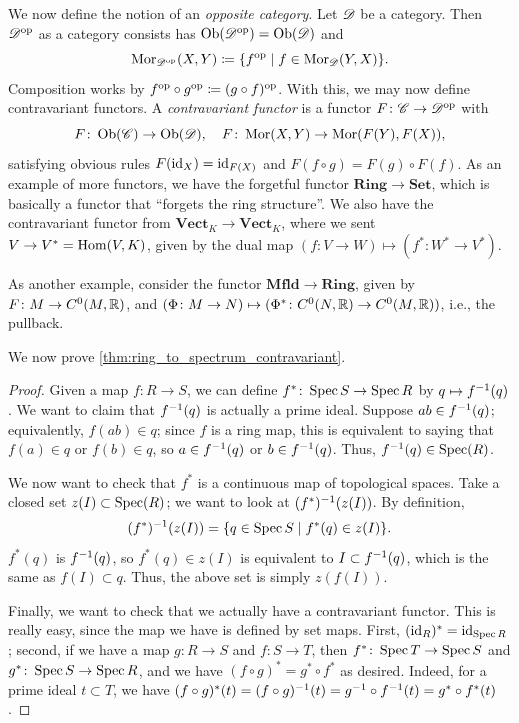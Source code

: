 We now define the notion of an \textit{opposite category}. Let $\mathscr D$ be a category. Then $\mathscr D^{\operatorname{op}}$ as a category consists has $\operatorname{Ob}(\mathscr D^{\operatorname{op}}) = \operatorname{Ob}(\mathscr D)$ and
\[ \operatorname{Mor}_{\mathscr D^{\operatorname{op}}}(X, Y) \coloneq \{f^{\operatorname{op}} \mid f \in \operatorname{Mor}_\mathscr D(Y, X)\}. \]
Composition works by $f^{\operatorname{op}} \circ g^{\operatorname{op}} \coloneq (g \circ f)^{\operatorname{op}}$. With this, we may now define contravariant functors. A \textit{contravariant functor} is a functor $F \colon \mathscr C \to \mathscr D^{\operatorname{op}}$ with
\[ F \colon \operatorname{Ob}(\mathscr C) \to \operatorname{Ob}(\mathscr D), \quad F \colon \operatorname{Mor}(X, Y) \to \operatorname{Mor}(F(Y), F(X)), \]
satisfying obvious rules $F(\mathrm{id}_X) = \mathrm{id}_{F(X)}$ and $F(f \circ g) = F(g) \circ F(f)$. As an example of more functors, we have the forgetful functor $\mathbf{Ring} \to \mathbf{Set}$, which is basically a functor that ``forgets the ring structure''. We also have the contravariant functor from $\mathbf{Vect}_K \to \mathbf{Vect}_K$, where we sent $V \to V^\ast = \operatorname{Hom}(V, K)$, given by the dual map $(f \colon V \to W) \mapsto (f^\ast \colon W^\ast \to V^\ast)$.

\newpage
As another example, consider the functor $\mathbf{Mfld} \to \mathbf{Ring}$, given by $F \colon M \to C^0(M, \mathbb R)$, and $(\Phi \colon M \to N) \mapsto (\Phi^\ast \colon C^0(N, \mathbb R) \to C^0(M, \mathbb R))$, i.e., the pullback.

We now prove \ref{thm:ring_to_spectrum_contravariant}.
\begin{proof}
    Given a map $f \colon R \to S$, we can define $f^\ast \colon \operatorname{Spec} S \to \operatorname{Spec} R$ by $q \mapsto f^{-1}(q)$. We want to claim that $f^{-1}(q)$ is actually a prime ideal. Suppose $ab \in f^{-1}(q)$; equivalently, $f(ab) \in q$; since $f$ is a ring map, this is equivalent to saying that $f(a) \in q$ or $f(b) \in q$, so $a \in f^{-1}(q)$ or $b \in f^{-1}(q)$. Thus, $f^{-1}(q) \in \operatorname{Spec}(R)$.

    We now want to check that $f^\ast$ is a continuous map of topological spaces. Take a closed set $z(I) \subset \operatorname{Spec}(R)$; we want to look at $(f^\ast)^{-1} (z(I))$. By definition,
    \[ (f^\ast)^{-1} (z(I)) = \{q \in \operatorname{Spec} S \mid f^\ast(q) \in z(I)\}. \]
    $f^\ast(q)$ is $f^{-1}(q)$, so $f^\ast(q) \in z(I)$ is equivalent to $I \subset f^{-1}(q)$, which is the same as $f(I) \subset q$. Thus, the above set is simply $z(f(I))$.

    Finally, we want to check that we actually have a contravariant functor. This is really easy, since the map we have is defined by set maps. First, $(\mathrm{id}_R)^\ast = \mathrm{id}_{\operatorname{Spec} R}$; second, if we have a map $g \colon R \to S$ and $f \colon S \to T$, then $f^\ast \colon \operatorname{Spec} T \to \operatorname{Spec} S$ and $g^\ast \colon \operatorname{Spec} S \to \operatorname{Spec} R$, and we have $(f \circ g)^\ast = g^\ast \circ f^\ast$ as desired. Indeed, for a prime ideal $t \subset T$, we have $(f \circ g)^\ast (t) = (f \circ g)^{-1} (t) = g^{-1} \circ f^{-1}(t) = g^\ast \circ f^\ast(t)$.
\end{proof}

